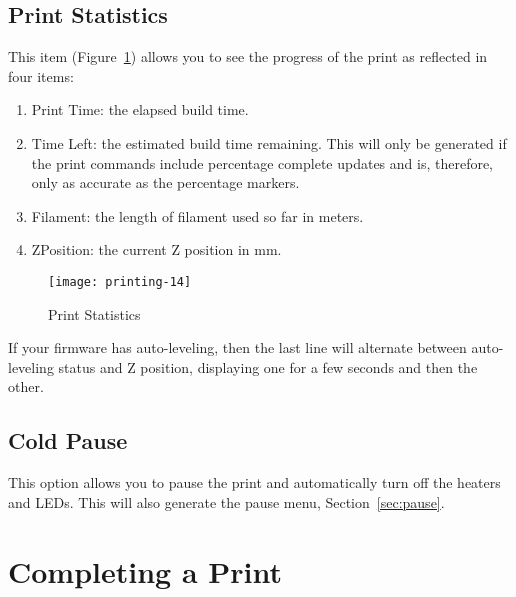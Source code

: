 \subsection{Print Statistics}\label{sec:printstat}

This item (Figure~\ref{fig:printstatistics}) allows you to see the progress of the print as reflected in four items:
\begin{enumerate}
\item Print Time: the elapsed build time.
\item Time Left: the estimated build time remaining.  This will only be generated if the print commands include percentage complete updates and is, therefore, only as accurate as the percentage markers.
\item Filament: the length of filament used so far in meters.
\item ZPosition: the current Z position in mm.
\end{enumerate}

\begin{figure}[!htbp]
  \centering
    \texttt{[image: printing-14]}
    \caption{Print Statistics}
  \label{fig:printstatistics}
\end{figure}

If your firmware has auto-leveling, then the last line will alternate between auto-leveling status and Z position, displaying one for a few seconds and then the other.


\subsection{Cold Pause}\label{sec:cold}

This option allows you to pause the print and automatically turn off the heaters and LEDs.  This will also generate the pause menu, Section~\ref{sec:pause}.


\section{Completing a Print} \label{sec:print-done}

